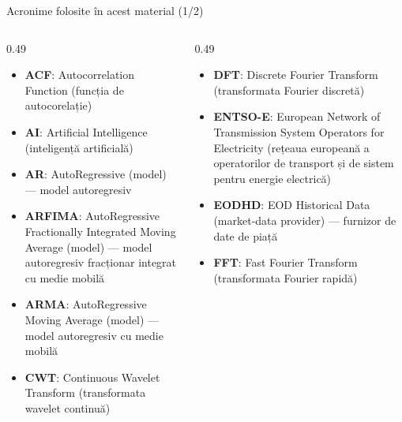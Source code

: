 \providecommand{\tsaapplink}[3]{\hypertarget{#2}{}\hyperlink{#1}{\beamergotobutton{#3}}}  %
\providecommand{\tsaappback}[2]{\begin{tikzpicture}[remember picture,overlay]\node[anchor=south east] at ([xshift=-3mm,yshift=7mm]current page.south east){\hyperlink{#1}{\beamerreturnbutton{#2}}};\end{tikzpicture}}  %
\providecommand{\tsachlink}[2]{\href{#1}{#2}}  %
\providecommand{\tsachlinkt}[2]{\href{#1}{\usebeamercolor[fg]{frametitle}#2}}  %


{
\begin{frame}[noframenumbering]
    \titlepage
\end{frame}
}
\begin{frame}{Acronime folosite în acest material (1/2)}
\begin{columns}[T]
\begin{column}{0.49\textwidth}
\begin{itemize}\setlength{\itemsep}{0pt}
    \item \textbf{ACF}: Autocorrelation Function (funcția de autocorelație)
    \item \textbf{AI}: Artificial Intelligence (inteligență artificială)
    \item \textbf{AR}: AutoRegressive (model) — model autoregresiv
    \item \textbf{ARFIMA}: AutoRegressive Fractionally Integrated Moving Average (model) — model autoregresiv fracționar integrat cu medie mobilă
    \item \textbf{ARMA}: AutoRegressive Moving Average (model) — model autoregresiv cu medie mobilă
    \item \textbf{CWT}: Continuous Wavelet Transform (transformata wavelet continuă)
\end{itemize}
\end{column}
\begin{column}{0.49\textwidth}
\begin{itemize}\setlength{\itemsep}{0pt}
    \item \textbf{DFT}: Discrete Fourier Transform (transformata Fourier discretă)
    \item \textbf{ENTSO-E}: European Network of Transmission System Operators for Electricity (rețeaua europeană a operatorilor de transport și de sistem pentru energie electrică)
    \item \textbf{EODHD}: EOD Historical Data (market-data provider) — furnizor de date de piață
    \item \textbf{FFT}: Fast Fourier Transform (transformata Fourier rapidă)
\end{itemize}
\end{column}
\end{columns}
\end{frame}
